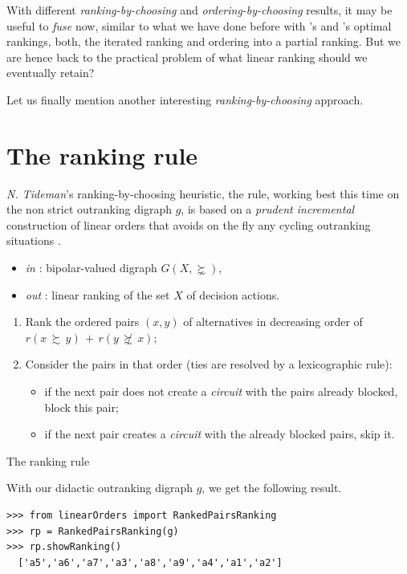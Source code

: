 With different \emph{ranking-by-choosing} and \emph{ordering-by-choosing} results, it may be useful to \emph{fuse} now, similar to what we have done before with \Kemeny 's and \Slater 's optimal rankings, both, the iterated \NetFlows ranking and ordering into a partial ranking. But we are hence back to the practical problem of what linear ranking should we eventually retain? 

Let us finally mention another interesting \emph{ranking-by-choosing} approach.

\section{The \RankedPairs ranking rule}
\label{sec:8.7}

\emph{N. Tideman}'s  ranking-by-choosing heuristic, the \RankedPairs rule, working best this time on the non strict outranking digraph $g$, is based on a \emph{prudent incremental} construction of linear orders that avoids on the fly any cycling outranking situations \citep{TID-1987}.

\begin{algorithm}
  {\footnotesize
\begin{itemize}
 \item [] \emph{in} : bipolar-valued digraph $G(X,\succnsim)$,
 \item [] \emph{out} : linear ranking of the set $X$ of decision actions.
\end{itemize}
\begin{enumerate}[leftmargin=0.5cm,rightmargin=0.5cm,topsep=1pt]
 \item Rank the ordered pairs $(x,y)$ of alternatives in decreasing order of $r(x\, \succsim \,y) \,+\, r(y\, \not\succsim \,x)$;
 \item Consider the pairs in that order (ties are resolved by a lexicographic rule):
   \begin{itemize}[nosep]
     \item if the next pair does not create a \emph{circuit} with the pairs already blocked, block this pair;
     \item if the next pair creates a \emph{circuit} with the already blocked pairs, skip it.
    \end{itemize}
  \end{enumerate}
  }
  \caption{The \RankedPairs ranking rule}
  \label{alg:8.5}
\end{algorithm}  

With our didactic outranking digraph $g$, we get the following result.
\begin{lstlisting}[caption={Computing a \RankedPairs ranking},label=list:8.17]   
>>> from linearOrders import RankedPairsRanking
>>> rp = RankedPairsRanking(g)
>>> rp.showRanking()
  ['a5','a6','a7','a3','a8','a9','a4','a1','a2']
\end{lstlisting}

